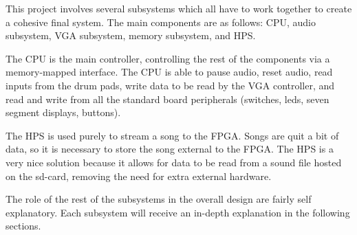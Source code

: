 \documentclass{subfile}
\begin{document}
  This project involves several subsystems which all have to work together to create a 
  cohesive final system. 
  The main components are as follows: CPU, audio subsystem, VGA subsystem, memory subsystem, 
  and HPS.

  The CPU is the main controller, controlling the rest of the components via a memory-mapped interface. 
  The CPU is able to pause audio, reset audio, read inputs from the drum pads, write data to be read 
  by the VGA controller, and read and write from all the standard board peripherals (switches, leds, seven 
  segment displays, buttons).

  The HPS is used purely to stream a song to the FPGA. 
  Songs are quit a bit of data, so it is necessary to store the song external to the FPGA. 
  The HPS is a very nice solution because it allows for data to be read from a sound file hosted 
  on the sd-card, removing the need for extra external hardware.

  The role of the rest of the subsystems in the overall design are fairly self explanatory. 
  Each subsystem will receive an in-depth explanation in the following sections.
\end{document}

